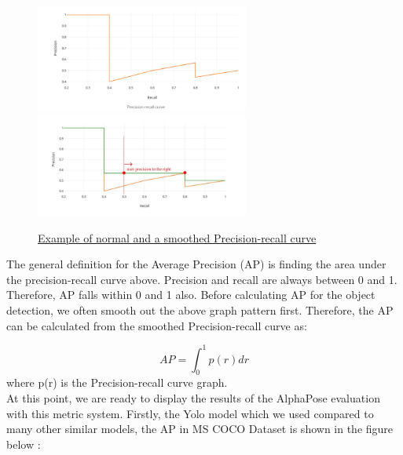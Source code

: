 \begin{figure}[htp]
    \centering
    \includegraphics[width=7cm]{figures/Evaluation/AP1.png}%
    \qquad
    \includegraphics[width=7cm]{figures/Evaluation/AP2.png}%
    \captionsetup{labelformat=empty}
	\caption{\href{https://jonathan-hui.medium.com/map-mean-average-precision-for-object-detection-45c121a31173}
	{Example of normal and a smoothed Precision-recall curve}}
\end{figure}


The general definition for the Average Precision (AP) is finding the area under the precision-recall curve above. Precision and recall are always between 0 and 1. Therefore, AP falls within 0 and 1 also. Before calculating AP for the object detection, we often smooth out the above graph pattern first. Therefore, the AP can be calculated from the smoothed Precision-recall curve as:

$$ AP = \int^1_0 p(r)dr $$
where p(r) is the Precision-recall curve graph.\\

At this point, we are ready to display the results of the AlphaPose evaluation with this metric system.
Firstly, the Yolo model which we used compared to many other similar models, the AP in MS COCO Dataset is shown in the figure below : 

